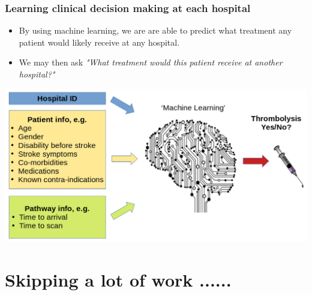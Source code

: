\documentclass{beamer}
\begin{document}

\begin{frame}
\frametitle{Learning clinical decision making at each hospital}
\begin{itemize}
    \item By using machine learning, we are are able to predict what treatment any patient would likely receive at any hospital.
    \item We may then ask \emph{"What treatment would this patient receive at another hospital?"}
\end{itemize}

\begin{center}
\includegraphics[width=1.0\textwidth]{./images/ml_model_high_level}
\end{center}

\end{frame}



\section{Skipping a lot of work ......}

\end{document}
